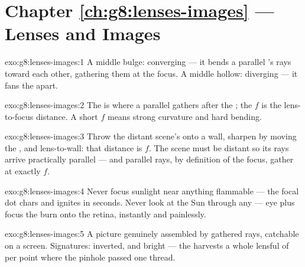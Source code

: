 \section*{Chapter \ref{ch:g8:lenses-images} --- Lenses and Images}

\begin{solution}{exo:g8:lenses-images:1}
A middle bulge: converging --- it bends a parallel 's rays
toward each other, gathering them at the focus. A middle
hollow: diverging --- it fans the  apart.
\end{solution}

\begin{solution}{exo:g8:lenses-images:2}
The  is where a parallel  gathers after the
; the  $f$ is the lens-to-focus distance. A
short $f$ means strong curvature and hard bending.
\end{solution}

\begin{solution}{exo:g8:lenses-images:3}
Throw the distant scene's  onto a wall, sharpen by moving
the , and  lens-to-wall: that distance is $f$. The
scene must be distant so its rays arrive practically parallel
--- and parallel rays, by definition of the focus, gather at
exactly $f$.
\end{solution}

\begin{solution}{exo:g8:lenses-images:4}
Never focus sunlight near anything flammable --- the focal dot
chars and ignites in seconds. Never look at the Sun through
any  --- eye plus  focus the burn onto the retina,
instantly and painlessly.
\end{solution}

\begin{solution}{exo:g8:lenses-images:5}
A picture genuinely assembled by gathered rays, catchable on a
screen. Signatures: inverted, and bright --- the  harvests
a whole lensful of  per point where the pinhole passed
one thread.
\end{solution}

